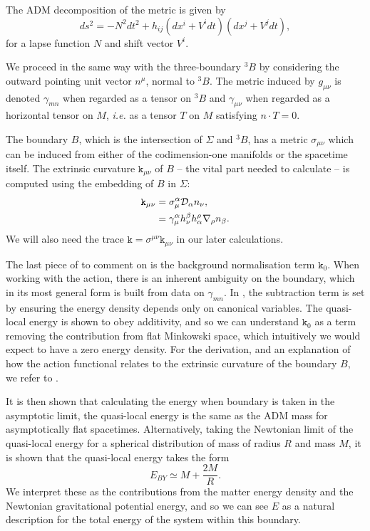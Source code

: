 The ADM decomposition \cite{arnowitt1959} of the metric is given by
\begin{equation}
\label{eq:ADM}
    ds^2 = -N^2 dt^2 + h_{ij} (dx^i + V^i dt)(dx^j + V^j dt),
\end{equation}
for a lapse function $N$ and shift vector $V^i$.

We proceed in the same way with the three-boundary ${}^3B$ by considering the outward pointing unit vector $n^\mu$, normal to ${}^3B$. The metric induced by $g_{\mu \nu}$ is denoted $\gamma_{mn}$ when regarded as a tensor on ${}^3B$ and $\gamma_{\mu \nu}$ when regarded as a horizontal tensor on $M$, \textit{i.e.} as a tensor $T$ on $M$ satisfying $n\cdot T = 0$. 

The boundary $B$, which is the intersection of $\Sigma$ and ${}^3B$, has a metric $\sigma_{\mu\nu}$ which can be induced from either of the codimension-one manifolds or the spacetime itself. The extrinsic curvature $\mathtt{k}_{\mu\nu}$ of $B$ – the vital part needed to calculate  – is computed using the embedding of $B$ in $\Sigma$:
\begin{equation}
\begin{aligned}
\label{eq:extexplicit}
\mathtt{k}_{\mu \nu} &= \sigma^\alpha_\mu {\cal D}_\alpha n_\nu, \\
&= \gamma^\alpha_\mu h^\beta_\nu h^\rho_\alpha \nabla_\rho n_\beta   . 
\end{aligned}
\end{equation}
We will also need the trace $\mathtt{k} = \sigma^{\mu\nu} \mathtt{k}_{\mu \nu}$ in our later calculations.

The last piece of  to comment on is the background normalisation term $\mathtt{k}_0$. When working with the action, there is an inherent ambiguity on the boundary, which in its most general form is built from data on $\gamma_{mn}$. In \cite{Brown:1992br}, the subtraction term is set by ensuring the energy density depends only on canonical variables. The quasi-local energy is shown to obey additivity, and so we can understand $\mathtt{k}_0$ as a term removing the contribution from flat Minkowski space, which intuitively we would expect to have a zero energy density. For the derivation, and an explanation of how the action functional relates to the extrinsic curvature of the boundary $B$, we refer to \cite{Brown:1992br}.

It is then shown that calculating the energy when boundary is taken in the asymptotic limit, the quasi-local energy is the same as the ADM mass for asymptotically flat spacetimes. Alternatively, taking the Newtonian limit of the quasi-local energy for a spherical distribution of mass of radius $R$ and mass $M$, it is shown that the quasi-local energy takes the form
\begin{equation*} 
E_{BY} \simeq M + \frac{2M}{R}.
\end{equation*} 
We interpret these as the contributions from the matter energy density and the Newtonian gravitational potential energy, and so we can see $E$ as a natural description for the total energy of the system within this boundary.

